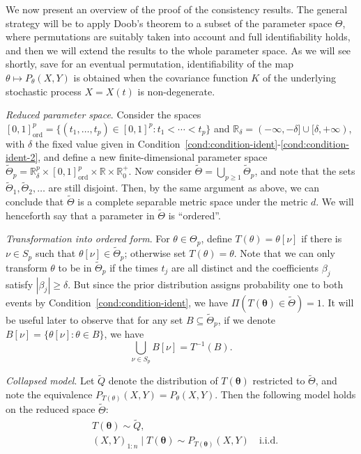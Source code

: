 \documentclass{article}
\numberwithin{equation}{section}
\theoremstyle{plain}
\newcommand{\R}{\mathbb{R}}
\newcommand{\tTheta}{\tilde{\Theta}}
\begin{document}
We now present an overview of the proof of the consistency results. The general strategy will be to apply Doob's theorem to a subset of the parameter space \(\Theta\), where permutations are suitably taken into account and full identifiability holds, and then we will extend the results to the whole parameter space. As we will see shortly, save for an eventual permutation, identifiability of the map \(\theta \mapsto P_\theta(X,Y)\) is obtained when the covariance function \(K\) of the underlying stochastic process \(X=X(t)\) is non-degenerate.

\textit{Reduced parameter space}. Consider the spaces \([0,1]^p_{\text{ord}} =\{(t_1,\dots, t_p) \in [0,1]^p: t_1 < \cdots < t_p\}\) and \(\R_\delta = (-\infty, -\delta]\cup[\delta, +\infty)\), with \(\delta\) the fixed value given in Condition~\ref{cond:condition-ident}-\ref{cond:condition-ident-2}, and define a new finite-dimensional parameter space \(\tTheta_p = \R^p_\delta \times [0,1]^p_{\text{ord}} \times \R \times \R^+_0\). Now consider \(\tTheta = \bigcup_{p\geq 1}\tTheta_p\), and note that the sets \(\tTheta_1,\tTheta_2,\ldots\) are still disjoint. Then, by the same argument as above, we can conclude that \(\tTheta\) is a complete separable metric space under the metric \(d\). We will henceforth say that a parameter in \(\tTheta\) is ``ordered''.

\textit{Transformation into ordered form}. For \(\theta\in\Theta_p\), define \(T(\theta)=\theta[\nu]\) if there is \(\nu\in S_p\) such that \(\theta[\nu]\in \tTheta_p\); otherwise set \(T(\theta)=\theta\). Note that we can only transform \(\theta\) to be in \(\tTheta_p\) if the times \(t_j\) are all distinct and the coefficients \(\beta_j\) satisfy \(|\beta_j|\geq\delta\). But since the prior distribution assigns probability one to both events by Condition~\ref{cond:condition-ident}, we have \(\Pi(T(\bm\theta)\in\tTheta)=1\). It will be useful later to observe that for any set \(B\subseteq \tTheta_p\), if we denote \(B[\nu] = \{\theta[\nu]: \theta \in B\}\), we have
\begin{equation}\label{eq:inverse-image-T}
  \bigcup_{\nu\in S_p} B[\nu] = T^{-1}(B).
\end{equation}

\textit{Collapsed model}. Let \(\tilde Q\) denote the distribution of \(T(\bm \theta)\) restricted to \(\tTheta\), and note the equivalence \(P_{T(\theta)}(X,Y)=P_{\theta}(X,Y)\). Then the following model holds on the reduced space \(\tTheta\):
\begin{equation}\label{eq:model-linear-collapsed}
  \begin{aligned}
     & T(\bm \theta) \sim \tilde{Q},                                               \\
     & (X,Y)_{1:n}\mid T(\bm\theta) \sim P_{T(\bm\theta)}(X,Y) \quad \text{i.i.d.}
  \end{aligned}
\end{equation}
\end{document}
